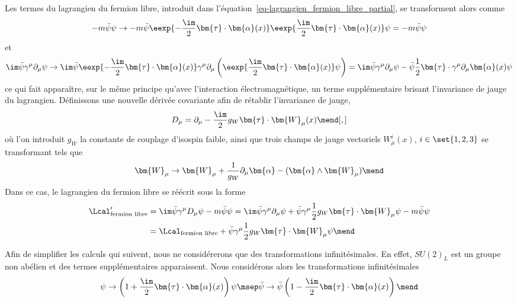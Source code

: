 Les termes du lagrangien du fermion libre, introduit dans l'équation~\eqref{eq-lagrangien_fermion_libre_partial}, se transforment alors comme
\begin{equation}
-m\bar{\psi}\psi
\to
-m\bar{\psi}\eexp{-\frac{\im}{2}\bm{\tau}\cdot\bm{\alpha}(x)}\eexp{\frac{\im}{2}\bm{\tau}\cdot\bm{\alpha}(x)}\psi
=-m\bar{\psi}\psi
\end{equation}
et
\begin{equation}
\im\bar{\psi} \gamma^\mu\partial_\mu \psi
\to
\im \bar{\psi}\eexp{-\frac{\im}{2}\bm{\tau}\cdot\bm{\alpha}(x)}\gamma^\mu\partial_\mu \left(\eexp{\frac{\im}{2}\bm{\tau}\cdot\bm{\alpha}(x)}\psi\right)
=
\im \bar{\psi}\gamma^\mu\partial_\mu \psi
-
\bar{\psi}\frac{1}{2}\bm{\tau}\cdot\gamma^\mu\partial_\mu\bm{\alpha}(x) \psi
\end{equation}
ce qui fait apparaître, sur le même principe qu'avec l'interaction électromagnétique, un terme supplémentaire brisant l'invariance de jauge du lagrangien. Définissons une nouvelle dérivée covariante afin de rétablir l'invariance de jauge,
\begin{equation}
D_\mu  = \partial_\mu  - \frac{\im}{2} g_W \bm{\tau}\cdot\bm{W}_\mu(x)
\mend[,]
\end{equation}
où l'on introduit $g_W$ la constante de couplage d'isospin faible, ainsi que trois champs de jauge vectoriels $W^i_\mu(x)$, $i\in\set{1,2,3}$ se transformant tels que
\begin{equation}
\bm{W}_\mu \to \bm{W}_\mu + \frac{1}{g_W}\partial_\mu\bm{\alpha} - (\bm{\alpha}\wedge\bm{W}_\mu)
\mend
\end{equation}
Dans ce cas, le lagrangien du fermion libre se réécrit sous la forme
\begin{align}
\Lcal_{\text{fermion libre}}'
&
= \im \bar{\psi} \gamma^\mu D_\mu \psi - m \bar{\psi}\psi
= \im \bar{\psi} \gamma^\mu \partial_\mu \psi + \bar{\psi} \gamma^\mu \frac{1}{2} g_W \bm{\tau}\cdot\bm{W}_\mu \psi - m \bar{\psi}\psi
\nonumber
\\&
=
\Lcal_{\text{fermion libre}}
+
\bar{\psi} \gamma^\mu \frac{1}{2} g_W \bm{\tau}\cdot\bm{W}_\mu \psi
\mend
\end{align}
\par Afin de simplifier les calculs qui suivent, nous ne considérerons que des transformations infinitésimales. En effet, $SU(2)_L$ est un groupe non abélien et des termes supplémentaires apparaissent. Nous considérons alors les transformations infinitésimales
\begin{equation}
\psi \to \left(1+\frac{\im}{2}\bm{\tau}\cdot\bm{\alpha}(x)\right)\psi
\msep
\bar{\psi} \to \bar{\psi}\left(1-\frac{\im}{2}\bm{\tau}\cdot\bm{\alpha}(x)\right)
\mend
\end{equation}
